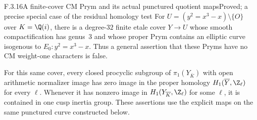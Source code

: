\begin{result}{F.3.16}{A finite-cover CM Prym and its actual punctured quotient maps}{Proved; a precise special case of the residual homology test}
For $U=(y^2=x^3-x)\setminus\{O\}$ over $K=\Q(i)$, there is a degree-$32$ finite etale cover $Y\to U$ whose smooth compactification has genus~3 and whose proper Prym contains an elliptic curve isogenous to $E_0:y^2=x^3-x$. Thus a general assertion that these Pryms have no CM weight-one characters is false.

For this same cover, every closed procyclic subgroup of $\pi_1(Y_{\overline K})$ with open arithmetic normalizer image has zero image in the proper homology $H_1(\overline Y,\Z_\ell)$ for every $\ell$. Whenever it has nonzero image in $H_1(Y_{\overline K},\Z_\ell)$ for some $\ell$, it is contained in one cusp inertia group. These assertions use the explicit maps on the same punctured curve constructed below.
\end{result}
